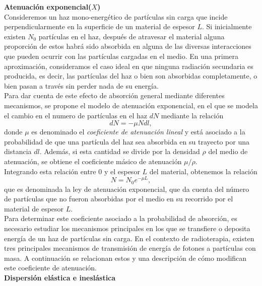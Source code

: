 \noindent
\textbf{Atenuación exponencial($X$)}\\


Consideremos un haz mono-energético de partículas sin carga que incide perpendicularmente en la superficie de un material de espesor $L$. Si inicialmente existen $N_0$ partículas en el haz, después de atravesar el material alguna proporción de estos habrá sido absorbida en alguna de las diversas interacciones que pueden ocurrir con las partículas cargadas en el medio. En una primera aproximación, consideramos el caso ideal en que ninguna radiación secundaria es producida, es decir, las partículas del haz o bien son absorbidas completamente, o bien pasan a través sin perder nada de su energía.\\

Para dar cuenta de este efecto de absorción general mediante diferentes mecanismos, se propone el modelo de atenuación exponencial, en el que se modela el cambio en el numero de partículas en el haz $dN$ mediante la relación
\begin{equation}
	dN=-\mu N dl,
\end{equation}  
donde $\mu$ es denominado el \textit{coeficiente de atenuación lineal} y está asociado a la probabilidad de que una partícula del haz sea absorbida en su trayecto por una distancia $dl$. Además, si esta cantidad se divide por la densidad $\rho$ del medio de atenuación, se obtiene el coeficiente másico de atenuación $\mu/\rho$.\\

Integrando esta relación entre $0$ y el espesor $L$ del material, obtenemos la relación
\begin{equation}
	N=N_0 e^{-\mu L},
\end{equation}
que es denominada la ley de atenuación exponencial, que da cuenta del número de partículas que no fueron absorbidas por el medio en su recorrido por el material de espesor $L$.\\

Para determinar este coeficiente asociado a la probabilidad de absorción, es necesario estudiar los mecanismos principales en los que se transfiere o deposita energía de un haz de partículas sin carga. En el contexto de radioterapia, existen tres principales mecanismos de transmisión de energía  de fotones a partículas con masa. A continuación se relacionan estos y una descripción de cómo modifican este coeficiente de atenuación.\\

\noindent
\textbf{Dispersión elástica e ineslástica}\\

